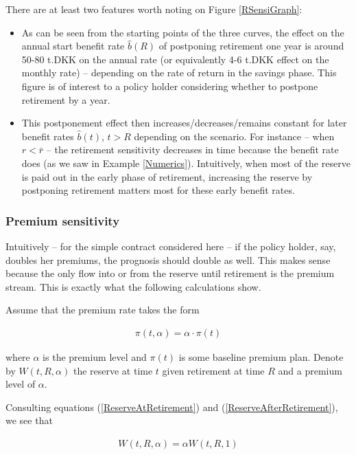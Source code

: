 \documentclass{article}
\newcommand{\1}[1]{\mathbbm{1}_{\left\lbrace #1 \right\rbrace}}
\theoremstyle{break}
\theoremstyle{remark}
\numberwithin{equation}{section}
\begin{document}
\begin{example}
There are at least two features worth noting on Figure \ref{RSensiGraph}:

\begin{itemize}
	\item As can be seen from the starting points of the three curves, the effect on the annual start benefit rate $\hat{b}(R)$ of postponing retirement one year is around 50-80 t.DKK on the annual rate (or equivalently 4-6 t.DKK effect on the monthly rate) -- depending on the rate of return in the savings phase. This figure is of interest to a policy holder considering whether to postpone retirement by a year.
	\item This postponement effect then increases/decreases/remains constant for later benefit rates $\hat{b}(t)$, $t>R$ depending on the scenario. For instance -- when $r < \bar{r}$ -- the retirement sensitivity decreases in time because the benefit rate does (as we saw in Example \ref{Numerics}). Intuitively, when most of the reserve is paid out in the early phase of retirement, increasing the reserve by postponing retirement matters most for these early benefit rates.
\end{itemize}
\end{example}

\subsubsection{Premium sensitivity}

Intuitively -- for the simple contract considered here -- if the policy holder, say, doubles her premiums, the prognosis should double as well. This makes sense because the only flow into or from the reserve until retirement is the premium stream. This is exactly what the following calculations show.

Assume that the premium rate takes the form

\begin{align*}
	\pi (t,\alpha) = \alpha \cdot \pi(t)
\end{align*}

where $\alpha$ is the premium level and $\pi(t)$ is some baseline premium plan. Denote by $W(t,R,\alpha)$ the reserve at time $t$ given retirement at time $R$ and a premium level of $\alpha$.

Consulting equations (\ref{ReserveAtRetirement}) and (\ref{ReserveAfterRetirement}), we see that

\begin{align*}
	W(t,R,\alpha) = \alpha W(t,R,1)
\end{align*}
\end{document}
